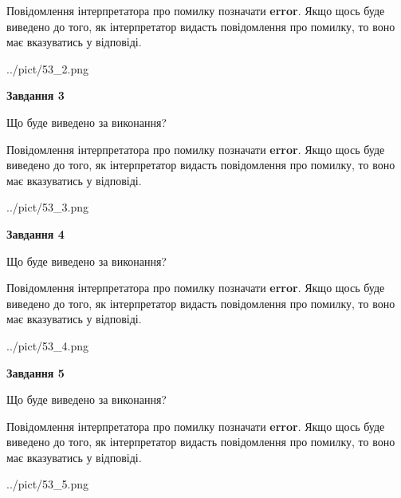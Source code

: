 \documentclass[12pt, ukrainian]{article}
\begin{document}
{\begin {large}
Повідомлення інтерпретатора про помилку позначати \textbf{error}.
Якщо щось буде виведено до того, як інтерпретатор видасть повідомлення про помилку, 
то воно має вказуватись у відповіді. \par


\begin{center}
	{../pict/53_2.png}
\end{center}
\newpage

{\begin {center}\textbf{Завдання 3}\end {center}}\par
Що буде виведено за виконання?

Повідомлення інтерпретатора про помилку позначати \textbf{error}.
Якщо щось буде виведено до того, як інтерпретатор видасть повідомлення про помилку, 
то воно має вказуватись у відповіді. \par


\begin{center}
	{../pict/53_3.png}
\end{center}
\newpage

{\begin {center}\textbf{Завдання 4}\end {center}}\par
Що буде виведено за виконання?

Повідомлення інтерпретатора про помилку позначати \textbf{error}.
Якщо щось буде виведено до того, як інтерпретатор видасть повідомлення про помилку, 
то воно має вказуватись у відповіді. \par


\begin{center}
	{../pict/53_4.png}
\end{center}
\newpage

{\begin {center}\textbf{Завдання 5}\end {center}}\par
Що буде виведено за виконання?

Повідомлення інтерпретатора про помилку позначати \textbf{error}.
Якщо щось буде виведено до того, як інтерпретатор видасть повідомлення про помилку, 
то воно має вказуватись у відповіді. \par


\begin{center}
	{../pict/53_5.png}
\end{center}
\newpage


\end{large}}
\end{document}
